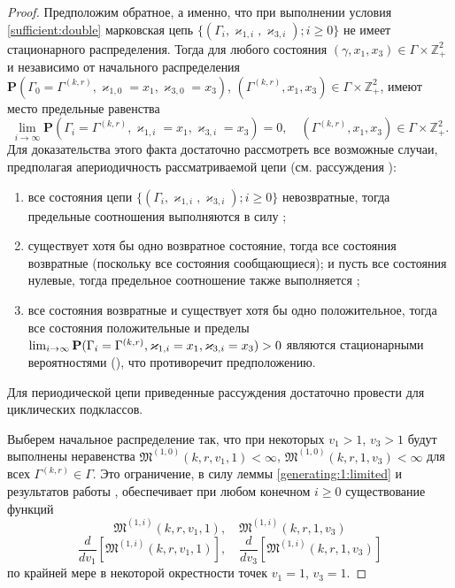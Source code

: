 \documentclass[12pt]{extarticle}
\theoremstyle{theorem}
\theoremstyle{remark}
\renewcommand*{\hm}[1]{#1\nobreak\discretionary{}%
	{\hbox{$\mathsurround=0pt #1$}}{}}%
\renewcommand{\Pr}{{\mathbf P}}
\begin{document}
\begin{proof}
Предположим обратное, а именно, что при выполнении условия \eqref{sufficient:double} марковская цепь $\{(\Gamma_i, \varkappa_{1,i},\varkappa_{3,i}); i \geqslant 0\}$ не имеет стационарного распределения. 
Тогда для любого состояния $(\gamma,x_1,x_3)\in \Gamma \times {\mathbb Z}^2_+$ и независимо от начального распределения $\Pr(\Gamma_{0}=\Gamma^{(k,r)}, \varkappa_{1,0}=x_1, \varkappa_{3,0}=x_3)$,
$(\Gamma^{(k,r)},x_1,x_3)\in \Gamma \times {\mathbb Z}^2_+$, 
имеют место предельные равенства 
\begin{equation}
\lim_{i \to \infty} \Pr(\Gamma_{i}=\Gamma^{(k,r)}, \varkappa_{1,i}=x_1, \varkappa_{3,i}=x_3) =0, \quad  (\Gamma^{(k,r)},x_1,x_3)\in \Gamma \times {\mathbb Z}^2_+.
\label{zero:limit:equations:1}
\end{equation} 
Для доказательства этого факта достаточно рассмотреть все возможные случаи, предполагая апериодичность рассматриваемой цепи (см. рассуждения \cite[гл. $3$, \linebreak \S~3-4]{Shiryaev}):
\begin{enumerate}
\item все состояния цепи $\{(\Gamma_i, \varkappa_{1,i},\varkappa_{3,i}); i \geqslant 0\}$ невозвратные, тогда предельные соотношения выполняются в силу \cite[с. 541, лемма $2$]{Shiryaev};
\item существует хотя бы одно возвратное состояние, тогда все состояния возвратные (поскольку все состояния сообщающиеся); и пусть все состояния нулевые, тогда предельное соотношение также выполняется \cite[с. 541, лемма $3$]{Shiryaev};
\item все состояния возвратные и существует хотя бы одно положительное, тогда все состояния положительные и пределы $\lim_{i \to \infty} \Pr(\Gamma_{i}\hm= \Gamma^{(k,r)}, \varkappa_{1,i}\hm= x_1, \varkappa_{3,i}\hm= x_3) > 0$ являются стационарными вероятностями ({\cite[с. 549, теорема $1$]{Shiryaev}}), что противоречит предположению.
\end{enumerate}
Для периодической цепи приведенные рассуждения достаточно провести для циклических подклассов.

Выберем начальное распределение так, что при некоторых $v_1 >1$, $v_3 >1$ будут выполнены неравенства $\mathfrak{M}^{(1,0)}(k,r,v_1,1) <\infty$, $\mathfrak{M}^{(1,0)}(k,r,1,v_3) <\infty$ для всех $\Gamma^{(k,r)}\in \Gamma$. Это ограничение, в силу леммы \eqref{generating:1:limited} и результатов работы \cite{Kocheganov:2017:1}, обеспечивает при любом конечном $i\geqslant 0$ существование функций 
\begin{equation}
\mathfrak{M}^{(1,i)}(k,r,v_1,1), \quad \mathfrak{M}^{(1,i)}(k,r,1,v_3)
\end{equation}
\begin{equation}
\frac{d}{dv_1} \left[\mathfrak{M}^{(1,i)}(k,r,v_1,1)\right], \quad \frac{d}{dv_3} \left[\mathfrak{M}^{(1,i)}(k,r,1,v_3)\right]
\end{equation}
по крайней мере в некоторой окрестности точек $v_1 = 1$, $v_3=1$.


\end{proof}
\end{document}
